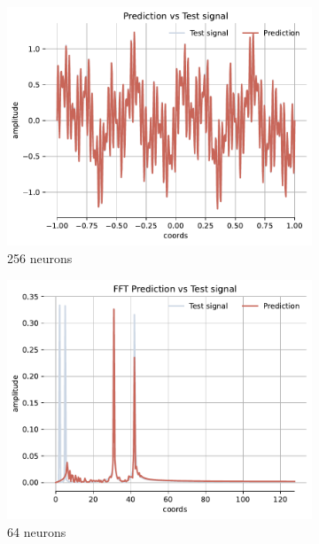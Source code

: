 \begin{figure}[h!]
    \begin{subfigure}[b]{0.32\textwidth}
        \centering
        \includegraphics[width=\textwidth]{img/ch4/prediction_w45all_hf256.pdf}
        \caption{256 neurons}
        \label{fig:rec-256-full-45}
    \end{subfigure}
    \begin{subfigure}[b]{0.32\textwidth}
        \centering
        \includegraphics[width=\textwidth]{img/ch4/fft_w45all_hf64.pdf}
        \caption{64 neurons}
        \label{fig:fft-64-full-45}
    \end{subfigure}
    \hfill
    \begin{subfigure}[b]{0.32\textwidth}

\end{subfigure}
\end{figure}
